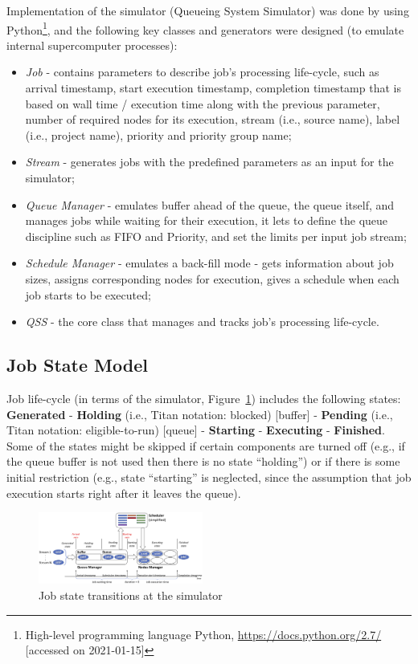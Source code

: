 Implementation of the simulator (Queueing System Simulator) \cite{ref-qss}
was done by using Python\footnote{High-level programming language Python,
\url{https://docs.python.org/2.7/} [accessed on 2021-01-15]}, and the
following key classes and generators were designed (to emulate internal
supercomputer processes):
\begin{itemize}
    \item \textit{Job} - contains parameters to describe job's processing
    life-cycle, such as arrival timestamp, start execution timestamp,
    completion timestamp that is based on wall time / execution time along
    with the previous parameter, number of required nodes for its execution,
    stream (i.e., source name), label (i.e., project name), priority and
    priority group name;
    \item \textit{Stream} - generates jobs with the predefined parameters as
    an input for the simulator;
    \item \textit{Queue Manager} - emulates buffer ahead of the queue, the
    queue itself, and manages jobs while waiting for their execution, it
    lets to define the queue discipline such as FIFO and Priority, and set
    the limits per input job stream;
    \item \textit{Schedule Manager} - emulates a back-fill mode - gets
    information about job sizes, assigns corresponding nodes for execution,
    gives a schedule when each job starts to be executed;
    \item \textit{QSS} - the core class that manages and tracks job's
    processing life-cycle.
\end{itemize}

\subsection{Job State Model} \label{appendix-simulator-description-2}

Job life-cycle (in terms of the simulator, Figure~\ref{fig-simulator-scheme})
includes the following states: \textbf{Generated} - \textbf{Holding} (i.e.,
Titan notation: blocked) [buffer] - \textbf{Pending} (i.e., Titan notation:
eligible-to-run) [queue] - \textbf{Starting} - \textbf{Executing} -
\textbf{Finished}.
Some of the states might be skipped if certain components are turned off (e.g.,
if the queue buffer is not used then there is no state ``holding'') or if there
is some initial restriction (e.g., state ``starting'' is neglected, since the
assumption that job execution starts right after it leaves the queue).

\begin{figure}
    \centering
    \includegraphics[width=0.48\textwidth]{pics/simulator-scheme.png}
    \caption{Job state transitions at the simulator}
    \label{fig-simulator-scheme}
\end{figure}
